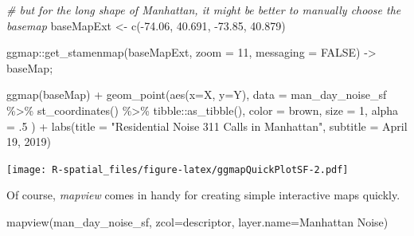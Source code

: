 \documentclass[
  11pt,
]{book}
\newenvironment{Shaded}{\begin{snugshade}}{\end{snugshade}}
\newcommand{\AttributeTok}[1]{\textcolor[rgb]{0.77,0.63,0.00}{#1}}
\newcommand{\CommentTok}[1]{\textcolor[rgb]{0.56,0.35,0.01}{\textit{#1}}}
\newcommand{\ConstantTok}[1]{\textcolor[rgb]{0.00,0.00,0.00}{#1}}
\newcommand{\DecValTok}[1]{\textcolor[rgb]{0.00,0.00,0.81}{#1}}
\newcommand{\FloatTok}[1]{\textcolor[rgb]{0.00,0.00,0.81}{#1}}
\newcommand{\FunctionTok}[1]{\textcolor[rgb]{0.00,0.00,0.00}{#1}}
\newcommand{\NormalTok}[1]{#1}
\newcommand{\OtherTok}[1]{\textcolor[rgb]{0.56,0.35,0.01}{#1}}
\newcommand{\SpecialCharTok}[1]{\textcolor[rgb]{0.00,0.00,0.00}{#1}}
\newcommand{\StringTok}[1]{\textcolor[rgb]{0.31,0.60,0.02}{#1}}
\begin{document}
\begin{Shaded}
\begin{Highlighting}[]
\CommentTok{\# but for the long shape of Manhattan, it might be better to manually choose the basemap}
\NormalTok{baseMapExt }\OtherTok{\textless{}{-}} \FunctionTok{c}\NormalTok{(}\SpecialCharTok{{-}}\FloatTok{74.06}\NormalTok{, }\FloatTok{40.691}\NormalTok{, }\SpecialCharTok{{-}}\FloatTok{73.85}\NormalTok{, }\FloatTok{40.879}\NormalTok{)}

\NormalTok{ggmap}\SpecialCharTok{::}\FunctionTok{get\_stamenmap}\NormalTok{(baseMapExt, }\AttributeTok{zoom =} \DecValTok{11}\NormalTok{, }\AttributeTok{messaging =} \ConstantTok{FALSE}\NormalTok{) }\OtherTok{{-}\textgreater{}}\NormalTok{ baseMap;}

\FunctionTok{ggmap}\NormalTok{(baseMap) }\SpecialCharTok{+}
  \FunctionTok{geom\_point}\NormalTok{(}\FunctionTok{aes}\NormalTok{(}\AttributeTok{x=}\NormalTok{X, }\AttributeTok{y=}\NormalTok{Y), }
             \AttributeTok{data =}\NormalTok{ man\_day\_noise\_sf }\SpecialCharTok{\%\textgreater{}\%} \FunctionTok{st\_coordinates}\NormalTok{() }\SpecialCharTok{\%\textgreater{}\%}\NormalTok{ tibble}\SpecialCharTok{::}\FunctionTok{as\_tibble}\NormalTok{(),}
             \AttributeTok{color =} \StringTok{\textquotesingle{}brown\textquotesingle{}}\NormalTok{,}
             \AttributeTok{size =} \DecValTok{1}\NormalTok{,}
             \AttributeTok{alpha =}\NormalTok{ .}\DecValTok{5}
\NormalTok{             ) }\SpecialCharTok{+} 
  \FunctionTok{labs}\NormalTok{(}\AttributeTok{title =} \StringTok{"Residential Noise 311 Calls in Manhattan"}\NormalTok{, }\AttributeTok{subtitle =} \StringTok{\textquotesingle{}April 19, 2019\textquotesingle{}}\NormalTok{)}
\end{Highlighting}
\end{Shaded}

\texttt{[image: R-spatial\_files/figure-latex/ggmapQuickPlotSF-2.pdf]}

Of course, \emph{mapview} comes in handy for creating simple interactive maps quickly.

\begin{Shaded}
\begin{Highlighting}[]
\FunctionTok{mapview}\NormalTok{(man\_day\_noise\_sf, }\AttributeTok{zcol=}\StringTok{\textquotesingle{}descriptor\textquotesingle{}}\NormalTok{, }\AttributeTok{layer.name=}\StringTok{\textquotesingle{}Manhattan Noise\textquotesingle{}}\NormalTok{)}
\end{Highlighting}
\end{Shaded}
\end{document}
